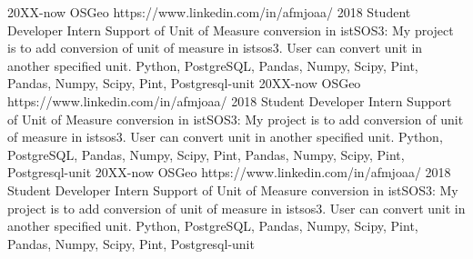 
\horizontalLineRight

\listItemOne
    {20XX-now}
    {OSGeo}
    {https://www.linkedin.com/in/afmjoaa/}
    {2018 Student Developer Intern}
    {Support of Unit of Measure conversion in istSOS3: My project is to add conversion of
    unit of measure in istsos3. User can convert unit in another specified unit.}
    {Python, PostgreSQL, Pandas, Numpy, Scipy, Pint,  Pandas, Numpy, Scipy, Pint, Postgresql-unit}
\listItemOne
    {20XX-now}
    {OSGeo}
    {https://www.linkedin.com/in/afmjoaa/}
    {2018 Student Developer Intern}
    {Support of Unit of Measure conversion in istSOS3: My project is to add conversion of
    unit of measure in istsos3. User can convert unit in another specified unit.}
    {Python, PostgreSQL, Pandas, Numpy, Scipy, Pint,  Pandas, Numpy, Scipy, Pint, Postgresql-unit}
\listItemOne
    {20XX-now}
    {OSGeo}
    {https://www.linkedin.com/in/afmjoaa/}
    {2018 Student Developer Intern}
    {Support of Unit of Measure conversion in istSOS3: My project is to add conversion of
    unit of measure in istsos3. User can convert unit in another specified unit.}
    {Python, PostgreSQL, Pandas, Numpy, Scipy, Pint,  Pandas, Numpy, Scipy, Pint, Postgresql-unit}